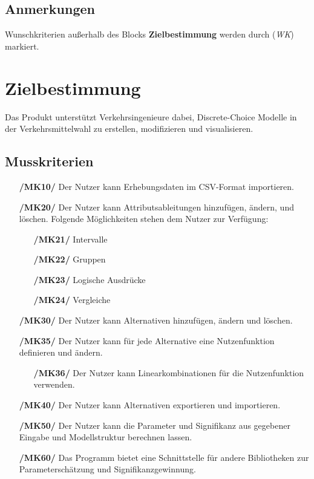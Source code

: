 \documentclass{article}
\begin{document}
\subsection{Anmerkungen}
Wunschkriterien außerhalb des Blocks \textbf{Zielbestimmung} werden durch (\textit{WK}) markiert.

\newpage
\section{Zielbestimmung}
Das Produkt unterstützt Verkehrsingenieure dabei, Discrete-Choice Modelle in der Verkehrsmittelwahl zu erstellen, modifizieren und visualisieren.
\subsection{Musskriterien}
\begin{itemize}
    \item[\textbf{/MK10/}] Der Nutzer kann Erhebungsdaten im CSV-Format importieren.
    \item[\textbf{/MK20/}] Der Nutzer kann Attributsableitungen hinzufügen, ändern, und löschen.
    \newline Folgende Möglichkeiten stehen dem Nutzer zur Verfügung:
    \begin{itemize}[leftmargin=.7in]
        \item[\textbf{/MK21/}] Intervalle
        \item[\textbf{/MK22/}] Gruppen
        \item[\textbf{/MK23/}] Logische Ausdrücke
        \item[\textbf{/MK24/}] Vergleiche
    \end{itemize}
    \item[\textbf{/MK30/}] Der Nutzer kann Alternativen hinzufügen, ändern und löschen.
    \item[\textbf{/MK35/}] Der Nutzer kann für jede Alternative eine Nutzenfunktion definieren und ändern.
    \begin{itemize}[leftmargin=.7in]
        \item[\textbf{/MK36/}] Der Nutzer kann Linearkombinationen für die Nutzenfunktion verwenden.
    \end{itemize}
    \item[\textbf{/MK40/}] Der Nutzer kann Alternativen exportieren und importieren.
    \item[\textbf{/MK50/}] Der Nutzer kann die Parameter und Signifikanz aus gegebener Eingabe und Modellstruktur berechnen lassen.
    \item[\textbf{/MK60/}] Das Programm bietet eine Schnittstelle für andere Bibliotheken zur Parameterschätzung und Signifikanzgewinnung. 

\end{itemize}
\end{document}
